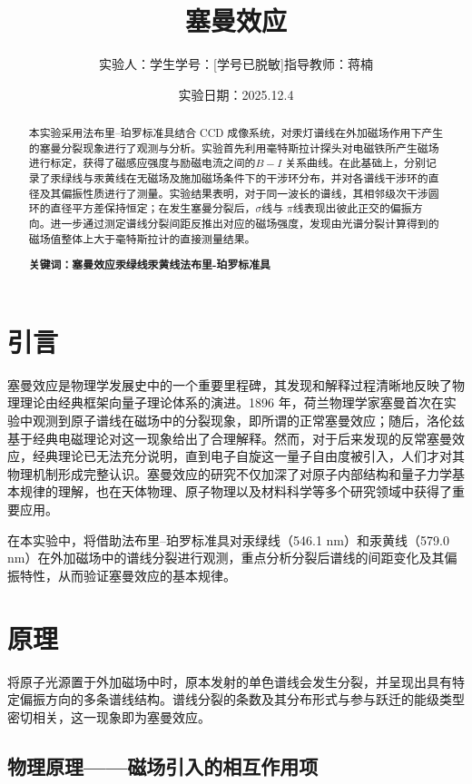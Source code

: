 \documentclass[a4paper, 1.5lines]{ctexart}
\title{塞曼效应}
\author{实验人：学生\qquad 学号：[学号已脱敏]\qquad 指导教师：蒋楠}
\date{实验日期：2025.12.4}
\begin{document}
    
    \maketitle
    
    \begin{abstract}
         本实验采用法布里–珀罗标准具结合 CCD 成像系统，对汞灯谱线在外加磁场作用下产生的塞曼分裂现象进行了观测与分析。实验首先利用毫特斯拉计探头对电磁铁所产生磁场进行标定，获得了磁感应强度与励磁电流之间的$ B\!-\!I$ 关系曲线。在此基础上，分别记录了汞绿线与汞黄线在无磁场及施加磁场条件下的干涉环分布，并对各谱线干涉环的直径及其偏振性质进行了测量。实验结果表明，对于同一波长的谱线，其相邻级次干涉圆环的直径平方差保持恒定；在发生塞曼分裂后，$\sigma$线与 $\pi $线表现出彼此正交的偏振方向。进一步通过测定谱线分裂间距反推出对应的磁场强度，发现由光谱分裂计算得到的磁场值整体上大于毫特斯拉计的直接测量结果。
        
         \textbf{\textbf{关键词：塞曼效应\quad 汞绿线\quad 汞黄线\quad 法布里-珀罗标准具}}
    \end{abstract}
    
    \section{引言}
        塞曼效应是物理学发展史中的一个重要里程碑，其发现和解释过程清晰地反映了物理理论由经典框架向量子理论体系的演进。1896 年，荷兰物理学家塞曼首次在实验中观测到原子谱线在磁场中的分裂现象，即所谓的正常塞曼效应；随后，洛伦兹基于经典电磁理论对这一现象给出了合理解释。然而，对于后来发现的反常塞曼效应，经典理论已无法充分说明，直到电子自旋这一量子自由度被引入，人们才对其物理机制形成完整认识。塞曼效应的研究不仅加深了对原子内部结构和量子力学基本规律的理解，也在天体物理、原子物理以及材料科学等多个研究领域中获得了重要应用。

        在本实验中，将借助法布里–珀罗标准具对汞绿线（546.1 nm）和汞黄线（579.0 nm）在外加磁场中的谱线分裂进行观测，重点分析分裂后谱线的间距变化及其偏振特性，从而验证塞曼效应的基本规律。
    \section{原理}
        将原子光源置于外加磁场中时，原本发射的单色谱线会发生分裂，并呈现出具有特定偏振方向的多条谱线结构。谱线分裂的条数及其分布形式与参与跃迁的能级类型密切相关，这一现象即为塞曼效应。

\subsection{物理原理——磁场引入的相互作用项}
\end{document}
